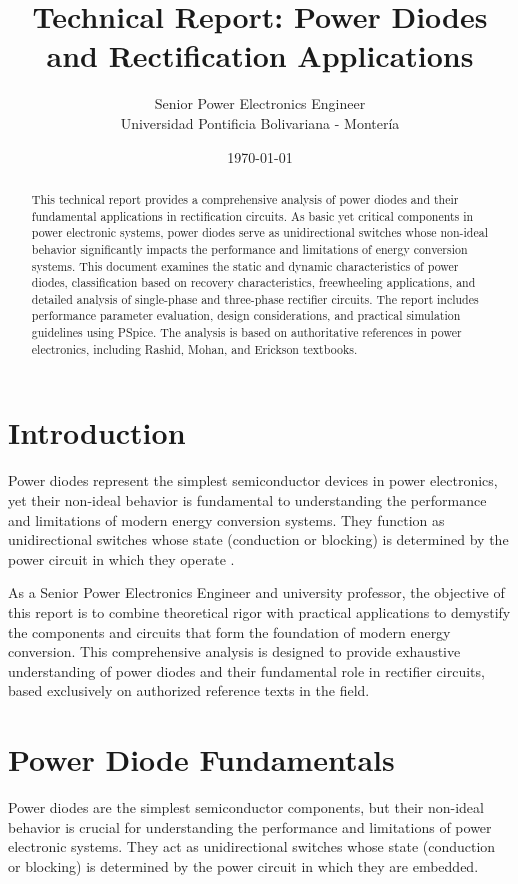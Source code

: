 \documentclass[12pt,a4paper]{article}
\title{\textbf{Technical Report: Power Diodes and Rectification Applications}}
\author{Senior Power Electronics Engineer\\Universidad Pontificia Bolivariana - Montería}
\date{\today}
\begin{document}
\maketitle

\begin{abstract}
This technical report provides a comprehensive analysis of power diodes and their fundamental applications in rectification circuits. As basic yet critical components in power electronic systems, power diodes serve as unidirectional switches whose non-ideal behavior significantly impacts the performance and limitations of energy conversion systems. This document examines the static and dynamic characteristics of power diodes, classification based on recovery characteristics, freewheeling applications, and detailed analysis of single-phase and three-phase rectifier circuits. The report includes performance parameter evaluation, design considerations, and practical simulation guidelines using PSpice. The analysis is based on authoritative references in power electronics, including Rashid, Mohan, and Erickson textbooks.
\end{abstract}

\section{Introduction}

Power diodes represent the simplest semiconductor devices in power electronics, yet their non-ideal behavior is fundamental to understanding the performance and limitations of modern energy conversion systems. They function as unidirectional switches whose state (conduction or blocking) is determined by the power circuit in which they operate \cite{rashid2014, mohan2003}.

As a Senior Power Electronics Engineer and university professor, the objective of this report is to combine theoretical rigor with practical applications to demystify the components and circuits that form the foundation of modern energy conversion. This comprehensive analysis is designed to provide exhaustive understanding of power diodes and their fundamental role in rectifier circuits, based exclusively on authorized reference texts in the field.

\section{Power Diode Fundamentals}

Power diodes are the simplest semiconductor components, but their non-ideal behavior is crucial for understanding the performance and limitations of power electronic systems. They act as unidirectional switches whose state (conduction or blocking) is determined by the power circuit in which they are embedded.
\end{document}
